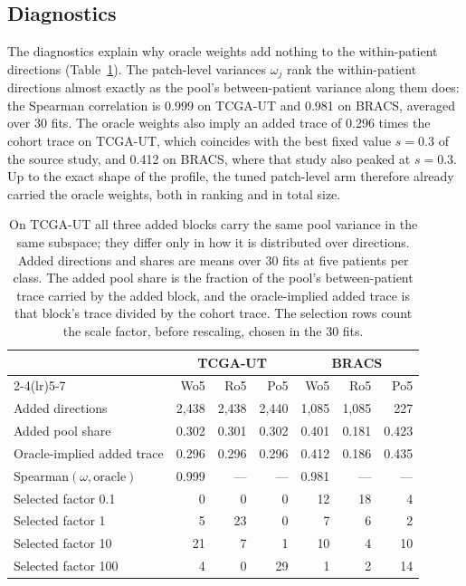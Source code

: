 \subsection{Diagnostics}
\label{sec:diagnostics-results}
The diagnostics explain why oracle weights add nothing to the within-patient directions (Table~\ref{tab:diagnostics}). The patch-level variances $\omega_j$ rank the within-patient directions almost exactly as the pool's between-patient variance along them does: the Spearman correlation is 0.999 on TCGA-UT and 0.981 on BRACS, averaged over 30 fits. The oracle weights also imply an added trace of 0.296 times the cohort trace on TCGA-UT, which coincides with the best fixed value $s=0.3$ of the source study, and 0.412 on BRACS, where that study also peaked at $s=0.3$. Up to the exact shape of the profile, the tuned patch-level arm therefore already carried the oracle weights, both in ranking and in total size.

\begin{table}[htbp]
\centering
\small
\renewcommand{\arraystretch}{1.15}
\begin{tabular}{@{}lrrrrrr@{}}
\toprule
 & \multicolumn{3}{c}{TCGA-UT} & \multicolumn{3}{c}{BRACS} \\
\cmidrule(lr){2-4}\cmidrule(lr){5-7}
 & Wo5 & Ro5 & Po5 & Wo5 & Ro5 & Po5 \\
\midrule
Added directions & 2,438 & 2,438 & 2,440 & 1,085 & 1,085 & 227 \\
Added pool share & 0.302 & 0.301 & 0.302 & 0.401 & 0.181 & 0.423 \\
Oracle-implied added trace & 0.296 & 0.296 & 0.296 & 0.412 & 0.186 & 0.435 \\
Spearman$(\omega,\text{oracle})$ & 0.999 & --- & --- & 0.981 & --- & --- \\
\addlinespace
Selected factor 0.1 & 0 & 0 & 0 & 12 & 18 & 4 \\
Selected factor 1 & 5 & 23 & 0 & 7 & 6 & 2 \\
Selected factor 10 & 21 & 7 & 1 & 10 & 4 & 10 \\
Selected factor 100 & 4 & 0 & 29 & 1 & 2 & 14 \\
\bottomrule
\end{tabular}
\caption{On TCGA-UT all three added blocks carry the same pool variance in the same subspace; they differ only in how it is distributed over directions. Added directions and shares are means over 30 fits at five patients per class. The added pool share is the fraction of the pool's between-patient trace carried by the added block, and the oracle-implied added trace is that block's trace divided by the cohort trace. The selection rows count the scale factor, before rescaling, chosen in the 30 fits.}
\label{tab:diagnostics}
\end{table}

